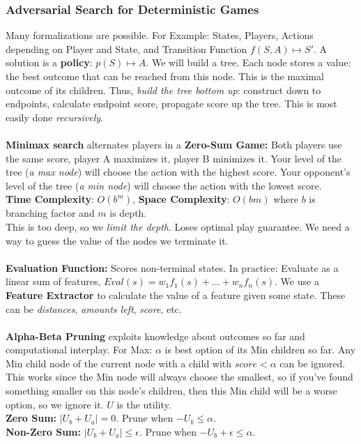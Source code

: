 \documentclass[]{article}
\begin{document}
\subsubsection{Adversarial Search for Deterministic Games}

Many formalizations are possible. For Example: States, Players, Actions depending on Player and State, and Transition Function $f(S,A) \mapsto S'$. A solution is a \textbf{policy}: $p(S) \mapsto A$. We will build a tree. Each node stores a value: the best outcome that can be reached from this node. This is the maximal outcome of its children. Thus, \emph{ build the tree bottom up}: construct down to endpoints, calculate endpoint score, propagate score up the tree. This is most easily done \emph{recursively}. 

\paragraph{}

\textbf{Minimax search} alternates players in a \textbf{Zero-Sum Game:} Both players use the same score, player A maximizes it, player B minimizes it. Your level of the tree (\emph{a max node}) will choose the action with the highest score. Your opponent's level of the tree (\emph{a min node}) will choose the action with the lowest score.
\\
\textbf{Time Complexity}: $O(b^m)$, \textbf{Space Complexity}: $O(bm)$ where $b$ is branching factor and $m$ is depth. \\
This is too deep, so we \emph{limit the depth}. Loses optimal play guarantee. We need a way to guess the value of the nodes we terminate it.

\paragraph{}

\textbf{Evaluation Function:} Scores non-terminal states. In practice: Evaluate as a linear sum of features, $Eval(s) = w_1f_1(s) + \dots + w_nf_n(s)$. We use a \textbf{Feature Extractor} to calculate the value of a feature given some state. These can be \emph{distances}, \emph{amounts left}, \emph{score}, etc.

\paragraph{}

\textbf{Alpha-Beta Pruning} exploits knowledge about outcomes so far and computational interplay. For Max: $\alpha$ is best option of its Min children so far. Any Min child node of the current node with a child with $score < \alpha$ can be ignored. This works since the Min node will always choose the smallest, so if you've found something smaller on this node's children, then this Min child will be a worse option, so we ignore it. $U$ is the utility.
\\
\textbf{Zero Sum:} $|U_b + U_a| = 0$. Prune when $-U_b \leq \alpha$.\\
\textbf{Non-Zero Sum:} $|U_b + U_a| \leq \epsilon$. Prune when $-U_b + \epsilon \leq \alpha$.
\end{document}
